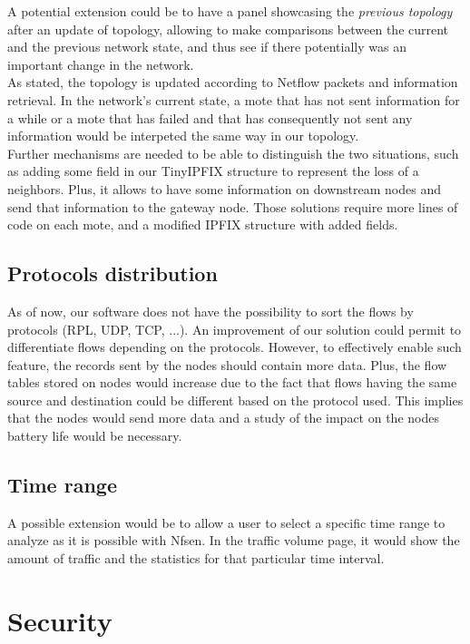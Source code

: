 A potential extension could be to have a panel showcasing the \textit{previous topology} after an update of topology, allowing to make comparisons between the current and the previous network state, and thus see if there potentially was an important change in the network.\\

As stated, the topology is updated according to Netflow packets and information retrieval. In the network's current state, a mote that has not sent information for a while or a mote that has failed and that has consequently not sent any information would be interpeted the same way in our topology. \\

Further mechanisms are needed to be able to distinguish the two situations, such as adding some field in our TinyIPFIX structure to represent the loss of a neighbors. Plus, it allows to have some information on downstream nodes and send that information to the gateway node. Those solutions require more lines of code on each mote, and a modified IPFIX structure with added fields.

\subsection*{Protocols distribution}

As of now, our software does not have the possibility to sort the flows by protocols (RPL, UDP, TCP, ...). An improvement of our solution could permit to differentiate flows depending on the protocols. However, to effectively enable such feature, the records sent by the nodes should contain more data. Plus, the flow tables stored on nodes would increase due to the fact that flows having the same source and destination could be different based on the protocol used. This implies that the nodes would send more data and a study of the impact on the nodes battery life would be necessary.

\subsection*{Time range}

A possible extension would be to allow a user to select a specific time range to analyze as it is possible with Nfsen. In the traffic volume page, it would show the amount of traffic and the statistics for that particular time interval.

\section{Security}

